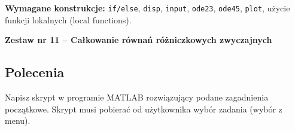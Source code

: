 \documentclass[a4paper,11pt]{article}
\begin{document}
\vspace{0.3cm}
\begin{ramka}
\textbf{Wymagane konstrukcje:}
\texttt{if/else}, \texttt{disp}, \texttt{input}, \texttt{ode23}, \texttt{ode45}, \texttt{plot}, użycie funkcji lokalnych (local functions).
\end{ramka}

\clearpage
\begin{center}
  {\large\bfseries Zestaw nr 11 \quad -- \quad Całkowanie równań różniczkowych zwyczajnych}
\end{center}
\hrulefill
\vspace{0.4cm}

\subsection*{Polecenia}

Napisz skrypt w programie MATLAB rozwiązujący podane zagadnienia początkowe. Skrypt musi pobierać od użytkownika wybór zadania (wybór z menu).
\end{document}
